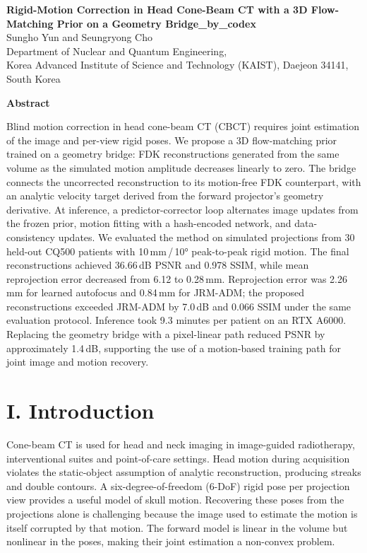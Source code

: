 \documentclass[11pt]{article}
\begin{document}
\begin{center}{\Large \textbf{Rigid-Motion Correction in Head Cone-Beam CT with a 3D Flow-Matching Prior on a Geometry Bridge\_by\_codex}}\\[10pt]
Sungho Yun and Seungryong Cho\\
Department of Nuclear and Quantum Engineering,\\
Korea Advanced Institute of Science and Technology (KAIST), Daejeon 34141, South Korea\end{center}

\textbf{Abstract}

Blind motion correction in head cone-beam CT (CBCT) requires joint estimation of the
image and per-view rigid poses. We propose a 3D flow-matching prior trained on a geometry
bridge: FDK reconstructions generated from the same volume as the simulated motion
amplitude decreases linearly to zero. The bridge connects the uncorrected reconstruction
to its motion-free FDK counterpart, with an analytic velocity target derived from the
forward projector's geometry derivative. At inference, a predictor-corrector loop
alternates image updates from the frozen prior, motion fitting with a hash-encoded network,
and data-consistency updates. We evaluated the method on simulated projections from 30
held-out CQ500 patients with 10\,mm\,/\,10° peak-to-peak rigid motion. The final
reconstructions achieved 36.66\,dB PSNR and 0.978 SSIM, while mean reprojection error
decreased from 6.12 to 0.28\,mm. Reprojection error was 2.26\,mm for learned autofocus
and 0.84\,mm for JRM-ADM; the proposed reconstructions exceeded JRM-ADM by 7.0\,dB and
0.066 SSIM under the same evaluation protocol. Inference took 9.3 minutes per patient
on an RTX A6000. Replacing the geometry bridge with a pixel-linear path reduced PSNR
by approximately 1.4\,dB, supporting the use of a motion-based training path for joint
image and motion recovery.

\section{I. Introduction}


Cone-beam CT is used for head and neck imaging in image-guided radiotherapy,
interventional suites and point-of-care settings. Head motion during acquisition
violates the static-object assumption of analytic reconstruction, producing streaks and
double contours. A six-degree-of-freedom (6-DoF) rigid pose per projection view provides
a useful model of skull motion. Recovering these poses from the projections alone is
challenging because the image used to estimate the motion is itself corrupted by that
motion. The forward model is linear in the volume but nonlinear in the poses, making
their joint estimation a non-convex problem.
\end{document}
